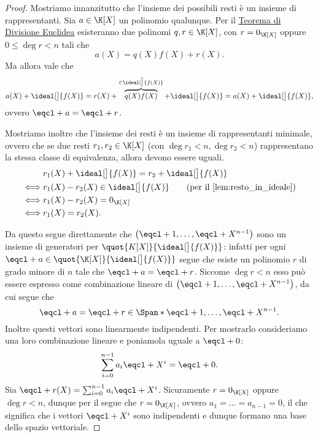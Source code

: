 \begin{proof}
    Mostriamo innanzitutto che l'insieme dei possibili resti è un insieme di rappresentanti. Sia $a \in \K[X]$ un polinomio qualunque. Per il \hyperref[th:divisione_euclidea_KX]{Teorema di Divisione Euclidea} esisteranno due polinomi $q, r \in \K[X]$, con $r = 0_{\K[X]}$ oppure $0 \leq \deg r < n$ tali che \[
        a(X) = q(X)f(X) + r(X).    
    \] Ma allora vale che \[
        a(X) + \ideal[\big]{f(X)} = r(X) + \overbrace{q(X)f(X)}^{\in \ideal[\big]{f(X)}} +  \ideal[\big]{f(X)} = a(X) + \ideal[\big]{f(X)},
    \] ovvero $\eqcl+ a = \eqcl+ r$.

    Mostriamo inoltre che l'insieme dei resti è un insieme di rappresentanti minimale, ovvero che se due resti $r_1, r_2 \in \K[X]$ (con $\deg r_1 < n, \deg r_2 < n$) rappresentano la stessa classe di equivalenza, allora devono essere uguali.
    \begin{align*}
        &r_1(X) + \ideal[\big]{f(X)} = r_2 + \ideal[\big]{f(X)} \\
        \iff &r_1(X) - r_2(X) \in \ideal[\big]{f(X)} \tag{per il \Cref{lem:resto_in_ideale}}\\
        \iff &r_1(X) - r_2(X) = 0_{\K[X]}\\
        \iff &r_1(X) = r_2(X).
    \end{align*}

    Da questo segue direttamente che $\left( \eqcl+ 1, \dots, \eqcl+{X^{n-1}} \right)$ sono un insieme di generatori per $\quot{K[X]}{\ideal[\big]{f(X)}}$: infatti per ogni $\eqcl+ a \in \quot{\K[X]}{\ideal[\big]{f(X)}}$ segue che esiste un polinomio $r$ di grado minore di $n$ tale che $\eqcl+ a = \eqcl+ r$. Siccome $\deg r < n$ esso può essere espresso come combinazione lineare di $\left( \eqcl+ 1, \dots, \eqcl+{X^{n-1}} \right)$, da cui segue che \[
        \eqcl+ a = \eqcl+ r \in \Span*{\eqcl+ 1, \dots, \eqcl+{X^{n-1}}}.
    \] Inoltre questi vettori sono linearmente indipendenti. Per mostrarlo consideriamo una loro combinazione lineare e poniamola uguale a $\eqcl+ 0$: \begin{align*}
        \sum_{i = 0}^{n-1} a_i\eqcl+{X^i} = \eqcl+ 0.
    \end{align*} Sia $\eqcl+{r(X)} = \sum_{i = 0}^{n-1} a_i\eqcl+{X^i}$. Sicuramente $r = 0_{\K[X]}$ oppure $\deg r < n$, dunque per il  segue che $r = 0_{\K[X]}$, ovvero $a_1 = \dots = a_{n-1} = 0$, il che significa che i vettori $\eqcl+{X^i}$ sono indipendenti e dunque formano una base dello spazio vettoriale.
\end{proof}

